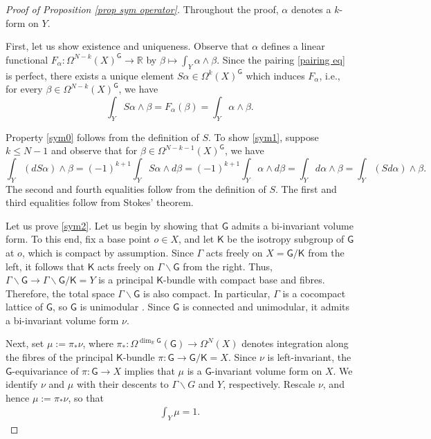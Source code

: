 \documentclass[11pt,reqno]{amsart}
\newcommand{\R}{\mathbb R}
\newcommand{\G}{\mathsf {G}}
\newcommand{\K}{\mathsf {K}}
\theoremstyle{plain}
\theoremstyle{definition}
\theoremstyle{remark}
\begin{document}
\begin{proof}[Proof of Proposition \ref{prop sym operator}]
    Throughout the proof, $\alpha$ denotes a $k$-form on $Y$.
    
    First, let us show existence and uniqueness.  Observe that $\alpha$ defines a linear functional $F_\alpha:\Omega^{N-k}(X)^\G \rightarrow \R$ by $\beta \mapsto  \int_Y \alpha \wedge \beta$. Since the pairing \eqref{pairing eq} is perfect,
     there exists a unique element $S\alpha \in \Omega^k(X)^\G$ which induces $F_\alpha$, i.e., for every $\beta \in\Omega^{N-k}(X)^\G$, we have
    $$\int_Y S \alpha \wedge \beta = F_{\alpha}(\beta) =\int_Y \alpha \wedge \beta. $$
    
    Property  \eqref{sym0} follows from the definition of $S$. To show \eqref{sym1}, suppose $k \leq N -1$ and observe that for $\beta \in \Omega^{N-k -1}(X)^\G$, we have
    $$\int_Y (d S \alpha) \wedge  \beta = (-1)^{k+1} \int_Y S\alpha \wedge d \beta = (-1)^{k+1} \int_Y \alpha \wedge d \beta = \int_Y d \alpha \wedge \beta = \int_Y (S d \alpha) \wedge \beta.$$
    The second and fourth equalities follow from the definition of $S$. The first and third equalities follow from Stokes' theorem. 

    Let us prove \eqref{sym2}. Let us begin by showing that $\G$ admits a bi-invariant volume form. To this end, fix a base point $o \in X$, and let $\K$ be the isotropy subgroup of $\G$ at $o$, which is compact by assumption. Since $\Gamma$ acts freely on $X = \G/ \K$ from the left, it follows that $\K$ acts freely on $\Gamma \backslash \G$ from the right. Thus, $\Gamma \backslash \G \rightarrow \Gamma \backslash \G / \K = Y$ is a principal $\K$-bundle with compact base and fibres. Therefore, the total space $\Gamma \backslash \G$ is also compact. In particular, $\Gamma$ is a cocompact lattice of $\G$, so $\G$ is unimodular \cite[Lemma 6.2]{milnor}. Since $\G$ is connected and unimodular, it admits a bi-invariant volume form $\nu$.

    Next, set $\mu := \pi_* \nu$, where $\pi_*: \Omega^{\dim_\R \G}(\G) \rightarrow  \Omega^N(X)$ denotes integration along the fibres of the principal $\K$-bundle $\pi: \G \rightarrow \G / \K = X$. Since $\nu$ is left-invariant, the $\G$-equivariance of $\pi: \G \rightarrow X$ implies that $\mu$ is a $\G$-invariant volume form on $X$. We identify $\nu$ and $\mu$ with their descents to $\Gamma \backslash G$ and $Y$, respectively. Rescale $\nu$, and hence $\mu := \pi_* \nu$, so that 
    \begin{align}
        \label{int equal 1}
        \int_Y \mu  =1.
    \end{align}
    

\end{proof}
\end{document}
